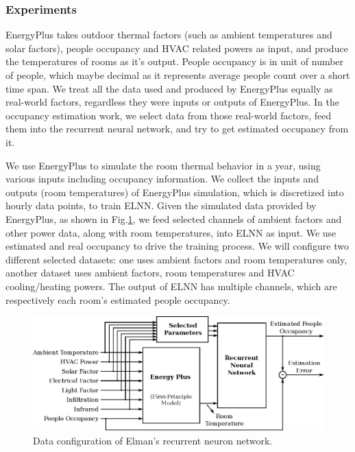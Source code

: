 \subsubsection{Experiments}
EnergyPlus takes outdoor thermal factors (such as ambient temperatures and solar
factors), people occupancy and HVAC related powers as input, and produce the
temperatures of rooms as it's output. People occupancy is in unit of number of
people, which maybe decimal as it represents average people count over a short
time span. We treat all the data used and produced by EnergyPlus equally as
real-world factors, regardless they were inputs or outputs of EnergyPlus. In the
occupancy estimation work, we select data from those real-world factors, feed
them into the recurrent neural network, and try to get estimated occupancy from
it.

We use EnergyPlus to simulate the room thermal behavior in a year, using various
inputs including occupancy information. We collect the inputs and outputs (room
temperatures) of EnergyPlus simulation, which is discretized into hourly data
points, to train ELNN. Given the simulated data
provided by EnergyPlus, as shown in Fig.\ref{fig:data-flow}, we feed selected
channels of ambient factors and other power data, along with room temperatures,
into ELNN as input. We use estimated and real
occupancy to drive the training process. We will configure two different
selected datasets: one uses ambient factors and room temperatures only, another
dataset uses ambient factors, room temperatures and HVAC cooling/heating
powers. The output of ELNN has multiple channels, which are
respectively each room's estimated people occupancy.

\begin{figure}[t]
    \centering
    \includegraphics[width=0.9\columnwidth]{figs/rnn/data-flow.eps}
    \caption{Data configuration of Elman's recurrent neuron network.}
    \label{fig:data-flow}
\end{figure}

